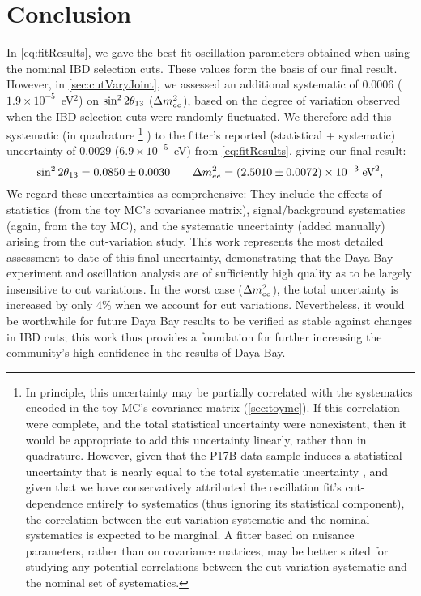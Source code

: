 \documentclass[../thesis.tex]{subfiles}
\begin{document}
\chapter{Conclusion}
\label{chap:conclusion}

In \autoref{eq:fitResults}, we gave the best-fit oscillation parameters obtained when using the nominal IBD selection cuts. These values form the basis of our final result. However, in \autoref{sec:cutVaryJoint}, we assessed an additional systematic of 0.0006 ($1.9\times10^{-5}$~eV$^2$) on $\sin^2 2\theta_{13}$ ($\Delta m^2_{ee}$), based on the degree of variation observed when the IBD selection cuts were randomly fluctuated. We therefore add this systematic (in quadrature%
\footnote{In principle, this uncertainty may be partially correlated with the systematics encoded in the toy MC's covariance matrix (\autoref{sec:toymc}). If this correlation were complete, and the total statistical uncertainty were nonexistent, then it would be appropriate to add this uncertainty linearly, rather than in quadrature. However, given that the P17B data sample induces a statistical uncertainty that is nearly equal to the total systematic uncertainty \cite{p17b_osc}, and given that we have conservatively attributed the oscillation fit's cut-dependence entirely to systematics (thus ignoring its statistical component), the correlation between the cut-variation systematic and the nominal systematics is expected to be marginal. A fitter based on nuisance parameters, rather than on covariance matrices, may be better suited for studying any potential correlations between the cut-variation systematic and the nominal set of systematics.}%
) to the fitter's reported (statistical + systematic) uncertainty of 0.0029 ($6.9\times10^{-5}$~eV) from \autoref{eq:fitResults}, giving our final result:
\begin{equation}
  \sin^2 2\theta_{13} = 0.0850 \pm 0.0030 \qquad \Delta m^2_{ee} = (2.5010 \pm 0.0072)\times10^{-3}\;\text{eV}^2,
\end{equation}
We regard these uncertainties as comprehensive: They include the effects of statistics (from the toy MC's covariance matrix), signal/background systematics (again, from the toy MC), and the systematic uncertainty (added manually) arising from the cut-variation study. This work represents the most detailed assessment to-date of this final uncertainty, demonstrating that the Daya Bay experiment and oscillation analysis are of sufficiently high quality as to be largely insensitive to cut variations. In the worst case ($\Delta m^2_{ee}$), the total uncertainty is increased by only 4\% when we account for cut variations. Nevertheless, it would be worthwhile for future Daya Bay results to be verified as stable against changes in IBD cuts; this work thus provides a foundation for further increasing the community's high confidence in the results of Daya Bay.
\end{document}
